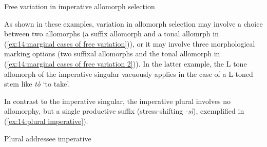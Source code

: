 \ea\label{ex:14:marginal cases of free variation 2}
{Free variation in imperative allomorph selection}

    \z
\z

As shown in these examples, variation in allomorph selection may involve a choice between two allomorphs (a suffix allomorph and a tonal allomrph in (\ref{ex:14:marginal cases of free variation})), or it may involve three morphological marking options (two suffixal allomorphs and the tonal allomorph in (\ref{ex:14:marginal cases of free variation 2})). In the latter example, the L tone allomorph of the imperative singular vacuously applies in the case of a L-toned stem like \textit{tò} `to take'.

In contrast to the imperative singular, the imperative plural involves no allomorphy, but a single productive suffix (stress-shifting \textit{-sì}), exemplified in (\ref{ex:14:plural imperative}).

\ea\label{ex:14:plural imperative}
{Plural addressee imperative}

